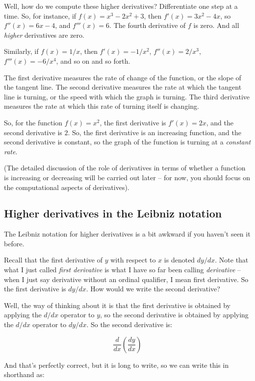 \documentclass[10pt]{amsart}
\begin{document}
Well, how do we compute these higher derivatives? Differentiate one
step at a time. So, for instance, if $f(x) = x^3 - 2x^2 + 3$, then
$f'(x) = 3x^2 - 4x$, so $f''(x) = 6x - 4$, and $f'''(x) = 6$. The
fourth derivative of $f$ is zero. And all {\em higher} derivatives are
zero.

Similarly, if $f(x) = 1/x$, then $f'(x) = -1/x^2$, $f''(x) = 2/x^3$,
$f'''(x) = -6/x^4$, and so on and so forth.

The first derivative measures the rate of change of the function, or
the slope of the tangent line. The second derivative measures the rate
at which the tangent line is turning, or the speed with which the
graph is turning. The third derivative measures the rate at which this
rate of turning itself is changing.

So, for the function $f(x) = x^2$, the first derivative is $f'(x) =
2x$, and the second derivative is $2$. So, the first derivative is an
increasing function, and the second derivative is constant, so the
graph of the function is turning at a {\em constant rate}.

(The detailed discussion of the role of derivatives in terms of
whether a function is increasing or decreasing will be carried out
later -- for now, you should focus on the computational aspects of
derivatives).

\subsection{Higher derivatives in the Leibniz notation}

The Leibniz notation for higher derivatives is a bit awkward if you
haven't seen it before.

Recall that the first derivative of $y$ with respect to $x$ is denoted
$dy/dx$. Note that what I just called {\em first derivative} is what I
have so far been calling {\em derivative} -- when I just say
derivative without an ordinal qualifier, I mean first derivative. So
the first derivative is $dy/dx$. How would we write the second
derivative?

Well, the way of thinking about it is that the first derivative is
obtained by applying the $d/dx$ operator to $y$, so the second
derivative is obtained by applying the $d/dx$ operator to $dy/dx$. So
the second derivative is:

$$\frac{d}{dx} \left(\frac{dy}{dx} \right)$$

And that's perfectly correct, but it is long to write, so we can write
this in shorthand as:
\end{document}
